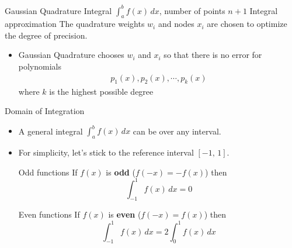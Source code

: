 \documentclass[10pt]{beamer}
\begin{document}
\begin{frame}{Gaussian Quadrature}
{Integral $\int_a^b f(x)\,dx$, number of points $n+1$}
{Integral approximation}
{The quadrature weights $w_i$ and nodes $x_i$ are chosen to optimize the degree of precision.}

\begin{itemize}
    \item Gaussian Quadrature chooses $w_i$ and $x_i$ so that there is no error for polynomials 
        \begin{align*}
            p_1(x), p_2(x), \cdots, p_k(x)
        \end{align*}
        where $k$ is the highest possible degree
\end{itemize}

\end{frame}

\begin{frame}{Domain of Integration}
\begin{itemize}
    \item A general integral $\int_a^b f(x)\,dx$ can be over any interval.

    \item For simplicity, let's stick to the reference interval $[-1, \,1]$. 

    \begin{block}{Odd functions}
        If $f(x)$ is \textbf{odd} ($f(-x)=-f(x)$) then 
        $$ \int_{-1}^{1} f(x) \,dx = 0$$
    \end{block}

    \begin{block}{Even functions}
        If $f(x)$ is \textbf{even} ($f(-x)=f(x)$) then 
        $$ \int_{-1}^{1} f(x) \,dx = 2\int_0^1 f(x)\,dx$$
    \end{block}
\end{itemize}

    
\end{frame}

\end{document}
